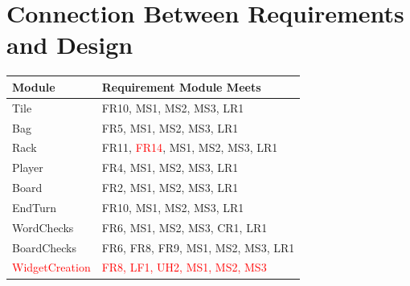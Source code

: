 \documentclass[12pt, titlepage]{article}
\begin{document}
\newpage 

\section{Connection Between Requirements and Design} %

\begin{table}[htp]
\centering
\begin{tabular}{|l|l|}
\hline
\textbf{Module} & \textbf{Requirement Module Meets}                                                                                                                   \\ \hline
Tile            & FR10, MS1, MS2, MS3, LR1                                                                                                                            \\ \hline
Bag             & FR5, MS1, MS2, MS3, LR1                                                                                                                             \\ \hline
Rack            & FR11, \textcolor{red}{FR14}, MS1, MS2, MS3, LR1                                                                                                                            \\ \hline
Player          & FR4, MS1, MS2, MS3, LR1                                                                                                                             \\ \hline
Board           & FR2, MS1, MS2, MS3, LR1                                                                                                                             \\ \hline
EndTurn         & FR10, MS1, MS2, MS3, LR1                                                                                                                            \\ \hline
WordChecks      & FR6, MS1, MS2, MS3, CR1, LR1                                                                                                                        \\ \hline
BoardChecks     & FR6, FR8, FR9, MS1, MS2, MS3, LR1                                                                                                                   \\ \hline
\textcolor{red}{WidgetCreation}     & \textcolor{red}{FR8, LF1, UH2, MS1, MS2, MS3}                                                                                                                   \\ \hline

\end{tabular}
\end{table}
\end{document}
